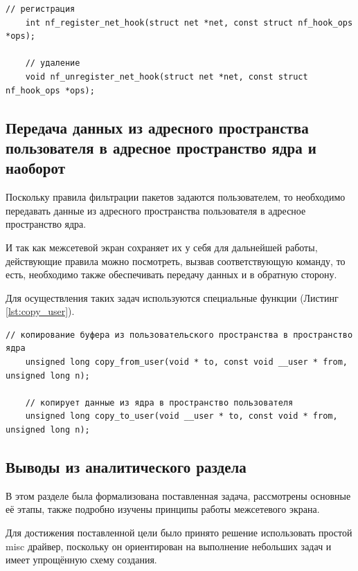 \begin{lstlisting}[caption = {Функции для регистрации и удаления хук-функций}, label=lst:hook_reg]
	// регистрация
	int nf_register_net_hook(struct net *net, const struct nf_hook_ops *ops);
	
	// удаление
	void nf_unregister_net_hook(struct net *net, const struct nf_hook_ops *ops);
\end{lstlisting}


\subsection{Передача данных из адресного пространства пользователя в адресное пространство ядра и наоборот}
Поскольку правила фильтрации пакетов задаются пользователем, то необходимо передавать данные из адресного пространства пользователя в адресное пространство ядра. 

И так как межсетевой экран сохраняет их у себя для дальнейшей работы, действующие правила можно посмотреть, вызвав соответствующую команду, то есть, необходимо также обеспечивать передачу данных и в обратную сторону. 

Для осуществления таких задач используются специальные функции (Листинг \ref{lst:copy_user}).

\begin{lstlisting}[caption = {Специальные функции}, label=lst:copy_user]
	// копирование буфера из пользовательского пространства в пространство ядра
	unsigned long copy_from_user(void * to, const void __user * from, unsigned long n);
	
	// копирует данные из ядра в пространство пользователя
	unsigned long copy_to_user(void __user * to, const void * from, unsigned long n);
\end{lstlisting}

\subsection{Выводы из аналитического раздела}
В этом разделе была формализована поставленная задача, рассмотрены основные её этапы, также подробно изучены принципы работы межсетевого экрана. 

Для достижения поставленной цели было принято решение использовать простой misc драйвер, поскольку он ориентирован на выполнение небольших задач и имеет упрощённую схему создания.


 